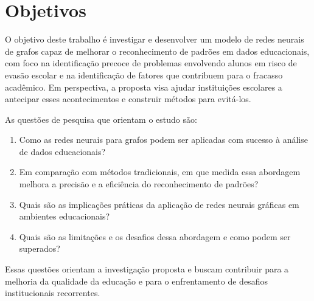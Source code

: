 \chapter{Objetivos}
\label{pre:objetivos}

O objetivo deste trabalho \'e investigar e desenvolver um modelo de redes neurais de grafos capaz de melhorar o reconhecimento de padr\~oes em dados educacionais, com foco na identifica\c{c}\~ao precoce de problemas envolvendo alunos em risco de evas\~ao escolar e na identifica\c{c}\~ao de fatores que contribuem para o fracasso acad\^emico. Em perspectiva, a proposta visa ajudar institui\c{c}\~oes escolares a antecipar esses acontecimentos e construir m\'etodos para evit\'a-los.

As quest\~oes de pesquisa que orientam o estudo s\~ao:

\begin{enumerate}
    \item Como as redes neurais para grafos podem ser aplicadas com sucesso \`a an\'alise de dados educacionais?
    \item Em compara\c{c}\~ao com m\'etodos tradicionais, em que medida essa abordagem melhora a precis\~ao e a efici\^encia do reconhecimento de padr\~oes?
    \item Quais s\~ao as implica\c{c}\~oes pr\'aticas da aplica\c{c}\~ao de redes neurais gr\'aficas em ambientes educacionais?
    \item Quais s\~ao as limita\c{c}\~oes e os desafios dessa abordagem e como podem ser superados?
\end{enumerate}

Essas quest\~oes orientam a investiga\c{c}\~ao proposta e buscam contribuir para a melhoria da qualidade da educa\c{c}\~ao e para o enfrentamento de desafios institucionais recorrentes.
